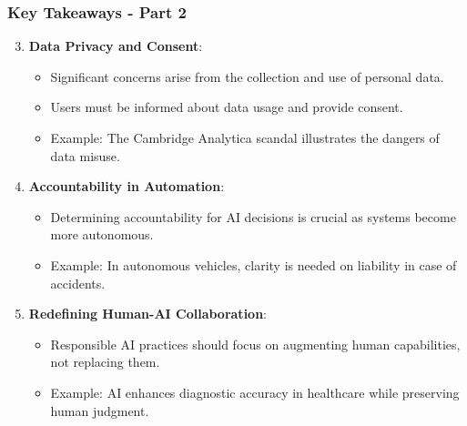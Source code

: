 \documentclass[aspectratio=169]{beamer}
\begin{document}
\begin{frame}[fragile]
    \frametitle{Key Takeaways - Part 2}
    \begin{enumerate}
        \setcounter{enumi}{2}
        
        \item \textbf{Data Privacy and Consent}:
        \begin{itemize}
            \item Significant concerns arise from the collection and use of personal data.
            \item Users must be informed about data usage and provide consent.
            \item Example: The Cambridge Analytica scandal illustrates the dangers of data misuse.
        \end{itemize}
        
        \item \textbf{Accountability in Automation}:
        \begin{itemize}
            \item Determining accountability for AI decisions is crucial as systems become more autonomous.
            \item Example: In autonomous vehicles, clarity is needed on liability in case of accidents.
        \end{itemize}
        
        \item \textbf{Redefining Human-AI Collaboration}:
        \begin{itemize}
            \item Responsible AI practices should focus on augmenting human capabilities, not replacing them.
            \item Example: AI enhances diagnostic accuracy in healthcare while preserving human judgment.
        \end{itemize}
    \end{enumerate}
\end{frame}
\end{document}
